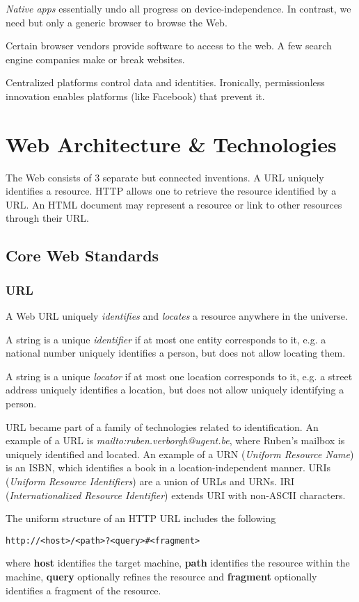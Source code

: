 \documentclass{report}
\begin{document}
\emph{Native apps} essentially undo
all progress on device-independence.
In contrast, we need but only
a generic browser to browse the Web.

Certain browser vendors provide
software to access to the web.
A few search engine companies make or break websites.

Centralized platforms control data and identities.
Ironically, permissionless innovation enables
platforms (like Facebook) that prevent it.

\chapter{Web Architecture \& Technologies}

The Web consists of 3 separate but connected inventions.
A URL uniquely identifies a resource.
HTTP allows one to retrieve the resource identified by a URL.
An HTML document may represent a resource
or link to other resources through their URL.

\section{Core Web Standards}

\subsection{URL}

A Web URL uniquely \emph{identifies} and \emph{locates}
a resource anywhere in the universe.

A string is a unique \emph{identifier} if
at most one entity corresponds to it,
e.g. a national number uniquely identifies a person,
but does not allow locating them.

A string is a unique \emph{locator} if
at most one location corresponds to it,
e.g. a street address uniquely identifies a location,
but does not allow uniquely identifying a person.

URL became part of a family of technologies related to identification.
An example of a URL is \textit{mailto:ruben.verborgh@ugent.be},
where Ruben's mailbox is uniquely identified and located.
An example of a URN (\emph{Uniform Resource Name}) is an ISBN,
which identifies a book in a location-independent manner.
URIs (\emph{Uniform Resource Identifiers})
are a union of URLs and URNs.
IRI (\emph{Internationalized Resource Identifier})
extends URI with non-ASCII characters.

The uniform structure of an HTTP URL includes the following
\begin{center}
  \texttt{http://<host>/<path>?<query>\#<fragment>}
\end{center}
where \textbf{host} identifies the target machine,
\textbf{path} identifies the resource within the machine,
\textbf{query} optionally refines the resource and
\textbf{fragment} optionally identifies a fragment of the resource.
\end{document}
